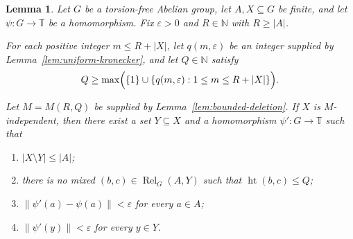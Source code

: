 \documentclass[10pt,a4paper]{amsart}
\newtheorem{lemma}[theorem]{Lemma}
\newcommand{\T}{\mathbb T}
\newcommand{\N}{\mathbb N}
\newcommand{\Rel}{\operatorname{Rel}}
\newcommand{\htop}{\operatorname{ht}}
\begin{document}
\begin{lemma}\label{lem:fusion-step}
Let $G$ be a torsion-free Abelian group, let $A,X\subseteq G$ be finite, and
let $\psi:G\to\T$ be a homomorphism. Fix $\varepsilon>0$ and
$R\in\N$ with $R\geq |A|$.

For each positive integer $m\leq R+|X|$, let $q(m,\varepsilon)$ be an
integer supplied by Lemma~\ref{lem:uniform-kronecker}, and let $Q\in\N$
satisfy
\[
Q\geq
\max\Bigl(
 \{1\}\cup
 \{q(m,\varepsilon):1\leq m\leq R+|X|\}
\Bigr).
\]

Let $M=M(R,Q)$ be supplied by Lemma~\ref{lem:bounded-deletion}. If $X$ is
$M$-independent, then there exist a set $Y\subseteq X$ and a
homomorphism $\psi':G\to\T$ such that
\begin{enumerate}
\item\label{item:fusion-delete}
$|X\setminus Y|\leq |A|$;

\item\label{item:fusion-no-mixed}
there is no mixed $(b,c)\in\Rel_G(A,Y)$ such that $\htop(b,c)\leq Q$;

\item\label{item:fusion-old}
$\|\psi'(a)-\psi(a)\|<\varepsilon$ for every $a\in A$;

\item\label{item:fusion-new}
$\|\psi'(y)\|<\varepsilon$ for every $y\in Y$.
\end{enumerate}
\end{lemma}
\end{document}
